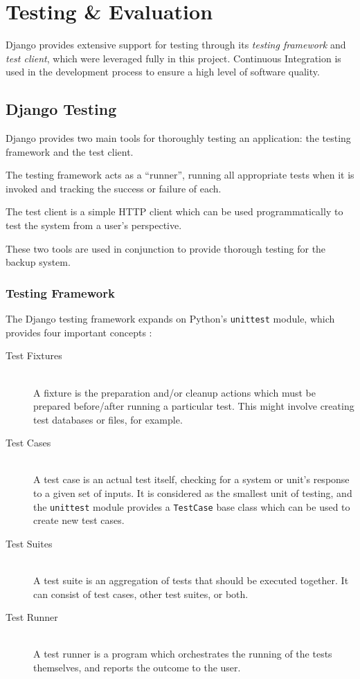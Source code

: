 \chapter{Testing \& Evaluation}
\label{sec:testing}

Django provides extensive support for testing through its \emph{testing
framework} and \emph{test client}, which were leveraged fully in this project.
Continuous Integration is used in the development process to ensure a high
level of software quality.

\section{Django Testing}
\label{sec:testing-django}

Django provides two main tools for thoroughly testing an application: the
testing framework and the test client.

The testing framework acts as a ``runner'', running all appropriate tests when
it is invoked and tracking the success or failure of each.

The test client is a simple HTTP client which can be used programmatically to
test the system from a user's perspective.

These two tools are used in conjunction to provide thorough testing for the
backup system.

\subsection{Testing Framework}
\label{sec:testing-django-framework}

The Django testing framework expands on Python's \verb!unittest! module, which
provides four important concepts \cite{unittest}:

\begin{description}
  \item[Test Fixtures] \hfill \\
      A fixture is the preparation and/or cleanup actions which must be
      prepared before/after running a particular test. This might involve
      creating test databases or files, for example.
  \item[Test Cases] \hfill \\
      A test case is an actual test itself, checking for a system or unit's
      response to a given set of inputs. It is considered as the smallest unit
      of testing, and the \verb!unittest! module provides a \verb!TestCase!
      base class which can be used to create new test cases.
  \item[Test Suites] \hfill \\
      A test suite is an aggregation of tests that should be executed together.
      It can consist of test cases, other test suites, or both.
  \item[Test Runner] \hfill \\
      A test runner is a program which orchestrates the running of the tests
      themselves, and reports the outcome to the user.
\end{description}

